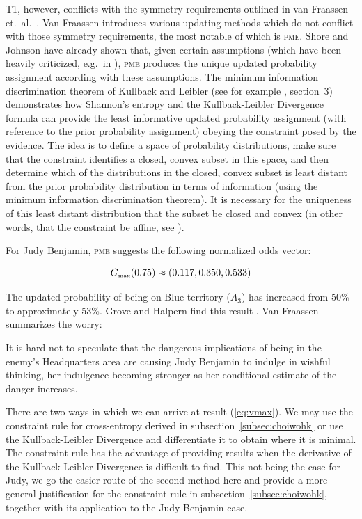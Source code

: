 \documentclass[phd,12pt,oneside]{ubcthesis}
\begin{document}
T1, however, conflicts with the symmetry requirements outlined in van
Fraassen et.\ al.\ . Van Fraassen
introduces various updating methods which do not conflict with those
symmetry requirements, the most notable of which is \textsc{pme}.
Shore and Johnson have already shown that, given certain assumptions
(which have been heavily criticized, e.g.\ in ),
\textsc{pme} produces the unique updated probability assignment
according with these assumptions. The minimum information
discrimination theorem of Kullback and Leibler (see for example
, section~3) demonstrates how Shannon's entropy
and the Kullback-Leibler Divergence formula can provide the least
informative updated probability assignment (with reference to the
prior probability assignment) obeying the constraint posed by the
evidence. The idea is to define a space of probability distributions,
make sure that the constraint identifies a closed, convex subset in
this space, and then determine which of the distributions in the
closed, convex subset is least distant from the prior probability
distribution in terms of information (using the minimum information
discrimination theorem). It is necessary for the uniqueness of this
least distant distribution that the subset be closed and convex (in
other words, that the constraint be affine, see
).

For Judy Benjamin, \textsc{pme} suggests the following normalized
odds vector:

\begin{equation}
  \label{eq:vmax}
  G_{\mbox{{\tiny max}}}(0.75)\approx(0.117,0.350,0.533)
\end{equation}

{\noindent}The updated probability of being on Blue territory ($A_{3}$) has
increased from 50\% to approximately 53\%. Grove and Halpern find this
result  .
Van Fraassen summarizes the worry:
\begin{quotex}
  It is hard not to speculate that the dangerous implications of being
  in the enemy's Headquarters area are causing Judy Benjamin to
  indulge in wishful thinking, her indulgence becoming stronger as her
  conditional estimate of the danger increases. 
\end{quotex}

\bigskip

\nial There are two ways in which we can arrive at result
({\ref{eq:vmax}}). We may use the constraint rule for cross-entropy
derived in subsection~\ref{subsec:choiwohk} or use the
Kullback-Leibler Divergence and differentiate it to obtain where it is
minimal. The constraint rule has the advantage of providing results
when the derivative of the Kullback-Leibler Divergence is difficult to
find. This not being the case for Judy, we go the easier route of the
second method here and provide a more general justification for the
constraint rule in subsection~\ref{subsec:choiwohk}, together with its
application to the Judy Benjamin case.
\end{document}
